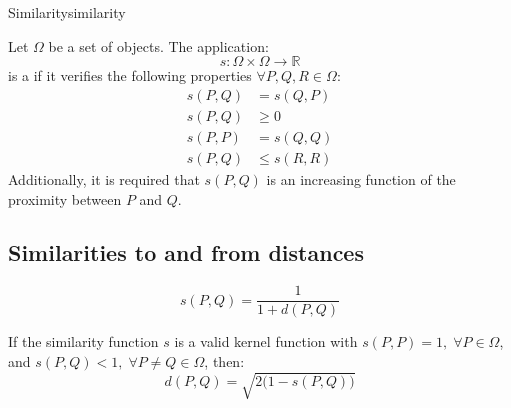 \begin{definition}{Similarity}{similarity}

    Let $\Omega$ be a set of objects. The application:
    \begin{equation*}
        s: \Omega \times \Omega \to \mathds{R}
    \end{equation*}
    is a  if it verifies the following properties $\forall P, Q, R \in \Omega$:
    \begin{align*}
        s(P, Q) &= s(Q, P) \tag{symmetry} \\
        s(P, Q) &\geq 0 \tag{non-negativity} \\
        s(P, P) &= s(Q, Q) \\
        s(P, Q) &\leq s(R, R)
    \end{align*}
    Additionally, it is required that $s(P, Q)$ is an increasing function of
    the proximity between $P$ and $Q$.
\end{definition}

\subsection{Similarities to and from distances}
\begin{equation*}
    s(P, Q) = \frac{1}{1 + d(P, Q)}
\end{equation*}

If the similarity function $s$ is a valid kernel function with $s(P, P) = 1,\;\forall P\in\Omega$,
and $s(P, Q) < 1,\;\forall P \neq Q \in \Omega$, then:
\begin{equation*}
    d(P, Q) = \sqrt{2\bigl(1 - s(P, Q)\bigr)}
\end{equation*}

